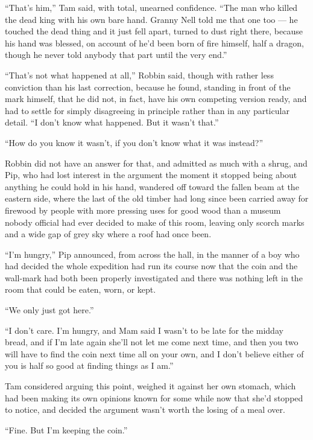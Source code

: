 “That’s him,” Tam said, with total, unearned confidence. “The man who killed the dead king with his own bare hand. Granny Nell told me that one too — he touched the dead thing and it just fell apart, turned to dust right there, because his hand was blessed, on account of he’d been born of fire himself, half a dragon, though he never told anybody that part until the very end.”

“That’s not what happened at all,” Robbin said, though with rather less conviction than his last correction, because he found, standing in front of the mark himself, that he did not, in fact, have his own competing version ready, and had to settle for simply disagreeing in principle rather than in any particular detail. “I don’t know what happened. But it wasn’t that.”

“How do you know it wasn’t, if you don’t know what it was instead?”

Robbin did not have an answer for that, and admitted as much with a shrug, and Pip, who had lost interest in the argument the moment it stopped being about anything he could hold in his hand, wandered off toward the fallen beam at the eastern side, where the last of the old timber had long since been carried away for firewood by people with more pressing uses for good wood than a museum nobody official had ever decided to make of this room, leaving only scorch marks and a wide gap of grey sky where a roof had once been.

\sceneBreak

“I’m hungry,” Pip announced, from across the hall, in the manner of a boy who had decided the whole expedition had run its course now that the coin and the wall-mark had both been properly investigated and there was nothing left in the room that could be eaten, worn, or kept.

“We only just got here.”

“I don’t care. I’m hungry, and Mam said I wasn’t to be late for the midday bread, and if I’m late again she’ll not let me come next time, and then you two will have to find the coin next time all on your own, and I don’t believe either of you is half so good at finding things as I am.”

Tam considered arguing this point, weighed it against her own stomach, which had been making its own opinions known for some while now that she’d stopped to notice, and decided the argument wasn’t worth the losing of a meal over.

“Fine. But I’m keeping the coin.”

